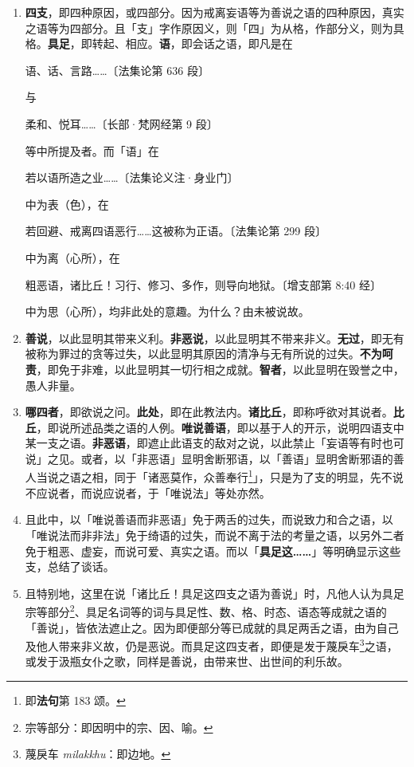 \begin{enumerate}\item \textbf{四支}，即四种原因，或四部分。因为戒离妄语等为善说之语的四种原因，真实之语等为四部分。且「支」字作原因义，则「四」为从格，作部分义，则为具格。\textbf{具足}，即转起、相应。\textbf{语}，即会话之语，即凡是在\begin{quoting}语、话、言路……{\bluefootnotesize 〔法集论第 636 段〕}\end{quoting}与\begin{quoting}柔和、悦耳……{\bluefootnotesize 〔长部·梵网经第 9 段〕}\end{quoting}等中所提及者。而「语」在\begin{quoting}若以语所造之业……{\bluefootnotesize 〔法集论义注·身业门〕}\end{quoting}中为表（色），在\begin{quoting}若回避、戒离四语恶行……这被称为正语。{\bluefootnotesize 〔法集论第 299 段〕}\end{quoting}中为离（心所），在\begin{quoting}粗恶语，诸比丘！习行、修习、多作，则导向地狱。{\bluefootnotesize 〔增支部第 8:40 经〕}\end{quoting}中为思（心所），均非此处的意趣。为什么？由未被说故。
\item \textbf{善说}，以此显明其带来义利。\textbf{非恶说}，以此显明其不带来非义。\textbf{无过}，即无有被称为罪过的贪等过失，以此显明其原因的清净与无有所说的过失。\textbf{不为呵责}，即免于非难，以此显明其一切行相之成就。\textbf{智者}，以此显明在毁誉之中，愚人非量。
\item \textbf{哪四者}，即欲说之问。\textbf{此处}，即在此教法内。\textbf{诸比丘}，即称呼欲对其说者。\textbf{比丘}，即说所述品类之语的人例。\textbf{唯说善语}，即以基于人的开示，说明四语支中某一支之语。\textbf{非恶语}，即遮止此语支的敌对之说，以此禁止「妄语等有时也可说」之见。或者，以「非恶语」显明舍断邪语，以「善语」显明舍断邪语的善人当说之语之相，同于「诸恶莫作，众善奉行\footnote{即\textbf{法句}第 183 颂。}」，只是为了支的明显，先不说不应说者，而说应说者，于「唯说法」等处亦然。
\item 且此中，以「唯说善语而非恶语」免于两舌的过失，而说致力和合之语，以「唯说法而非非法」免于绮语的过失，而说不离于法的考量之语，以另外二者免于粗恶、虚妄，而说可爱、真实之语。而以「\textbf{具足这……}」等明确显示这些支，总结了谈话。
\item 且特别地，这里在说「诸比丘！具足这四支之语为善说」时，凡他人认为具足宗等部分\footnote{宗等部分：即因明中的宗、因、喻。}、具足名词等的词与具足性、数、格、时态、语态等成就之语的「善说」，皆依法遮止之。因为即便部分等已成就的具足两舌之语，由为自己及他人带来非义故，仍是恶说。而具足这四支者，即便是发于蔑戾车\footnote{蔑戾车 \textit{milakkhu}：即边地。}之语，或发于汲瓶女仆之歌，同样是善说，由带来世、出世间的利乐故。

\end{enumerate}
